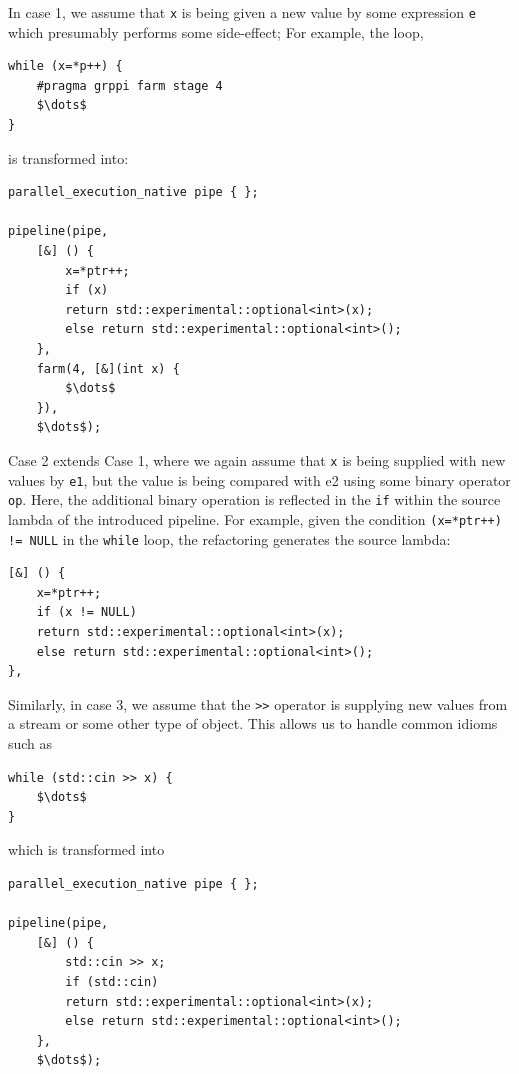 \noindent
In case 1, we assume that \texttt{x} is being given a new value by some
expression \texttt{e} which presumably performs some side-effect;
For example, the loop,
% 
\begin{lstlisting}[mathescape]
while (x=*p++) {
    #pragma grppi farm stage 4
    $\dots$
}
\end{lstlisting}
% 
\noindent
is transformed into:
% 
\begin{lstlisting}[mathescape]
parallel_execution_native pipe { };

pipeline(pipe,
    [&] () {
    	x=*ptr++;
    	if (x)
    	return std::experimental::optional<int>(x);
    	else return std::experimental::optional<int>();
    },
    farm(4, [&](int x) {
        $\dots$
    }),
    $\dots$);
\end{lstlisting}
% 
Case 2 extends Case 1, where we again assume that \texttt{x} is being supplied with new
values by \texttt{e1}, but the value is being compared with e2 using some
binary operator \texttt{op}. Here, the additional binary operation is reflected in the \texttt{if} within the source lambda of the introduced pipeline. For example, given the condition \lstinline|(x=*ptr++) != NULL| in the \texttt{while} loop, the refactoring generates the source lambda:
% 
\begin{lstlisting}[mathescape]
[&] () {
	x=*ptr++;
	if (x != NULL)
	return std::experimental::optional<int>(x);
	else return std::experimental::optional<int>();
},
\end{lstlisting}

% 
Similarly, in case 3, we assume that the \texttt{>>}
operator is supplying new values from a stream or some other type of
object. This allows us to handle common idioms such as
\begin{lstlisting}[mathescape]
while (std::cin >> x) {
    $\dots$
}
\end{lstlisting}
% 
\noindent
which is transformed into
% 
\begin{lstlisting}[mathescape]
parallel_execution_native pipe { };

pipeline(pipe,
	[&] () {
		std::cin >> x;
		if (std::cin)
		return std::experimental::optional<int>(x);
		else return std::experimental::optional<int>();
	},
	$\dots$);
\end{lstlisting}

